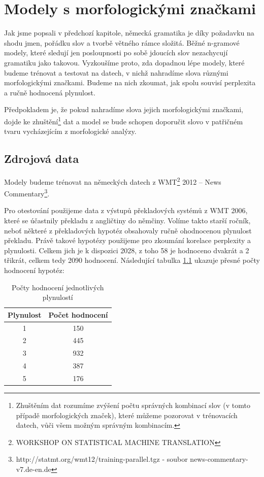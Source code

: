 \documentclass[12pt,a4paper]{report}
\begin{document}
\chapter{Modely s morfologickými značkami}
Jak jsme popsali v předchozí kapitole, německá gramatika je díky požadavku na shodu jmen, pořádku slov a tvorbě větného rámce složitá. Běžné n-gramové modely, které sledují jen posloupnosti po sobě jdoucích slov nezachycují gramatiku jako takovou. Vyzkoušíme proto, zda dopadnou lépe modely, které budeme trénovat a testovat na datech, v nichž nahradíme slova různými morfologickými značkami. Budeme na nich zkoumat, jak spolu souvisí perplexita a ručně hodnocená plynulost.

Předpokladem je, že pokud nahradíme slova jejich morfologickými značkami, dojde ke zhuštění\footnote{Zhuštěním dat rozumíme zvýšení počtu správných kombinací slov (v tomto případě morfologických značek), které můžeme pozorovat v trénovacích datech, vůči všem možným správným kombinacím.} dat a model se bude schopen doporučit slovo v patřičném tvaru vycházejícím z morfologické analýzy.

\section{Zdrojová data}
Modely budeme trénovat na německých datech z WMT\footnote{WORKSHOP ON STATISTICAL MACHINE TRANSLATION} 2012 -- News Commentary\footnote{http://statmt.org/wmt12/training-parallel.tgz - soubor news-commentary-v7.de-en.de}.

Pro otestování použijeme data z výstupů překladových systémů z WMT 2006, které se účastnily překladu z angličtiny do němčiny. Volíme takto starší ročník, neboť některé z překladových hypotéz obsahovaly ručně ohodnocenou plynulost překladu. Právě takové hypotézy použijeme pro zkoumání korelace perplexity a plynulosti. Celkem jich je k dispozici 2028, z toho 58 je hodnoceno dvakrát a 2 třikrát, celkem tedy 2090 hodnocení. Následující tabulka \ref{tb:poctyfluency} ukazuje přesné počty hodnocení hypotéz:

\begin{table}[!htbp]
\begin{center}\begin{tabular}{|c|c|}
	\hline
	\textbf{Plynulost} & \textbf{Počet hodnocení}\\
	\hline
	1 & 150\\
	\hline
	2 & 445\\
	\hline
	3 & 932\\
	\hline
	4 & 387\\
	\hline
	5 & 176\\
	\hline
\end{tabular}
\caption{Počty hodnocení jednotlivých plynulostí}\label{tb:poctyfluency}
\end{center}
\end{table}
\end{document}
